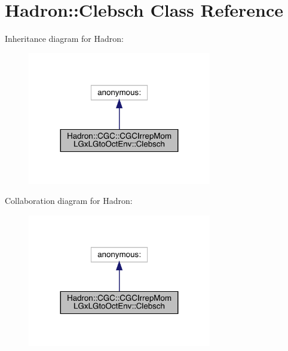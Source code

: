 \hypertarget{classHadron_1_1CGC_1_1CGCIrrepMomLGxLGtoOctEnv_1_1Clebsch}{}\section{Hadron\+:\+:Clebsch Class Reference}
\label{classHadron_1_1CGC_1_1CGCIrrepMomLGxLGtoOctEnv_1_1Clebsch}


Inheritance diagram for Hadron\+:\nopagebreak
\begin{figure}[H]
\begin{center}
\leavevmode
\includegraphics[width=227pt]{d6/dfd/classHadron_1_1CGC_1_1CGCIrrepMomLGxLGtoOctEnv_1_1Clebsch__inherit__graph}
\end{center}
\end{figure}


Collaboration diagram for Hadron\+:\nopagebreak
\begin{figure}[H]
\begin{center}
\leavevmode
\includegraphics[width=227pt]{d5/d06/classHadron_1_1CGC_1_1CGCIrrepMomLGxLGtoOctEnv_1_1Clebsch__coll__graph}
\end{center}
\end{figure}
